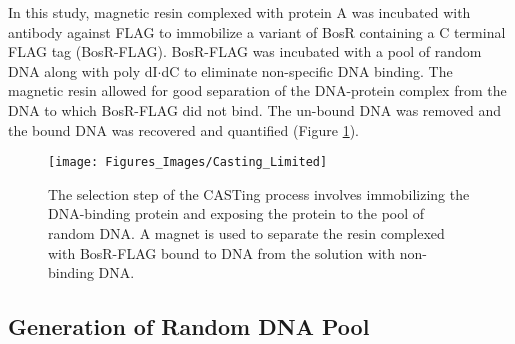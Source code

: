 \documentclass[12pt,twoside]{reedthesis}
\begin{document}
          	
          	In this study, magnetic resin complexed with protein A was incubated with antibody against FLAG to immobilize a variant of BosR containing a C terminal FLAG tag (BosR-FLAG). BosR-FLAG was incubated with a pool of random DNA along with poly dI$\cdot$dC to eliminate non-specific DNA binding. The magnetic resin allowed for good separation of the DNA-protein complex from the DNA to which BosR-FLAG did not bind. The un-bound DNA was removed and the bound DNA was recovered and quantified (Figure \ref{Selectionscheme}). 
          	
          \clearpage
        
          	 
          	\begin{figure}[[h!tbp]
          		\centering
          		\texttt{[image: Figures\_Images/Casting\_Limited]}
          		\caption[CASTing Selection Scheme]{The selection step of the CASTing process involves immobilizing the DNA-binding protein and exposing the protein to the pool of random DNA. A magnet is used to separate the resin complexed with BosR-FLAG bound to DNA from the solution with non-binding DNA.}
          		\label{Selectionscheme}
          	\end{figure}
          	
         
          		
          	 \subsection{Generation of Random DNA Pool}
    
\end{document}
